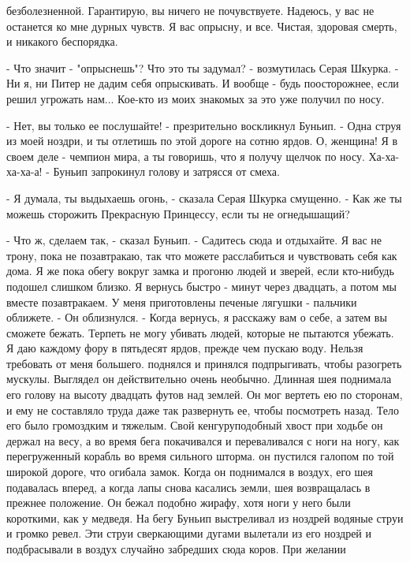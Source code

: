 безболезненной. Гарантирую, вы ничего не почувствуете. Надеюсь, у вас 
не останется ко мне дурных чувств. Я вас опрысну, и все. Чистая, 
здоровая смерть, и никакого беспорядка.
\par- Что значит - "опрыснешь"? Что это ты задумал? - возмутилась 
Серая Шкурка. - Ни я, ни Питер не дадим себя опрыскивать. И вообще - 
будь поосторожнее, если решил угрожать нам... Кое-кто из моих знакомых 
за это уже получил по носу.
\par- Нет, вы только ее послушайте! - презрительно воскликнул Буньип. 
- Одна струя из моей ноздри, и ты отлетишь по этой дороге на сотню 
ярдов. О, женщина! Я в своем деле - чемпион мира, а ты говоришь, что я 
получу щелчок по носу. Ха-ха-ха-ха-а! - Буньип запрокинул голову и 
затрясся от смеха.
\par- Я думала, ты выдыхаешь огонь, - сказала Серая Шкурка смущенно. - 
Как же ты можешь сторожить Прекрасную Принцессу, если ты не 
огнедышащий?
\par- Что ж, сделаем так, - сказал Буньип. - Садитесь сюда и 
отдыхайте. Я вас не трону, пока не позавтракаю, так что можете 
расслабиться и чувствовать себя как дома. Я же пока обегу вокруг замка 
и прогоню людей и зверей, если кто-нибудь подошел слишком близко. Я 
вернусь быстро - минут через двадцать, а потом мы вместе позавтракаем. 
У меня приготовлены печеные лягушки - пальчики оближете. - Он 
облизнулся. - Когда вернусь, я расскажу вам о себе, а затем вы сможете 
бежать. Терпеть не могу убивать людей, которые не пытаются убежать. Я 
даю каждому фору в пятьдесят ярдов, прежде чем пускаю воду. Нельзя 
требовать от меня большего.
 поднялся и принялся подпрыгивать, чтобы разогреть мускулы. 
Выглядел он действительно очень необычно. Длинная шея поднимала его 
голову на высоту двадцать футов над землей. Он мог вертеть ею по 
сторонам, и ему не составляло труда даже так развернуть ее, чтобы 
посмотреть назад. Тело его было громоздким и тяжелым. Свой 
кенгуруподобный хвост при ходьбе он держал на весу, а во время бега 
покачивался и переваливался с ноги на ногу, как перегруженный корабль 
во время сильного шторма.
 он пустился галопом по той широкой дороге, что огибала 
замок. Когда он поднимался в воздух, его шея подавалась вперед, а 
когда лапы снова касались земли, шея возвращалась в прежнее положение. 
Он бежал подобно жирафу, хотя ноги у него были короткими, как у 
медведя. На бегу Буньип выстреливал из ноздрей водяные струи и громко 
ревел. Эти струи сверкающими дугами вылетали из его ноздрей и 
подбрасывали в воздух случайно забредших сюда коров. При желании 
